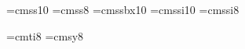 
\ifx\tenpoint\undefined\let\loadedfrommacro=Y
	
	\let\loadedfrommacro=N\fi

\font\tenss=cmss10     \font\eightss=cmss8
\font\tenssbf=cmssbx10 
\font\tensssl=cmssi10  \font\eightsl=cmssi8

\font\eighti=cmti8
\font\eightsy=cmsy8

\ifx\tenpointss\undefined
   \def\tenpointss{\def\rm{\fam0\tenss}%
       \textfont0=\tenss \scriptfont0=\eightss \scriptscriptfont0=\eightss
       \textfont1=\teni  \scriptfont1=\eighti  \scriptscriptfont1=\eighti
       \textfont2=\tensy \scriptfont2=\eightsy \scriptscriptfont2=\eightsy
       \textfont3=\tenex \scriptfont3=\tenex   \scriptscriptfont3=\tenex
       \textfont\itfam=\tensssl  \def\it{\fam\itfam\tensssl}%
       \textfont\slfam=\tensssl  \def\sl{\fam\slfam\tensssl}%
       \textfont\ttfam=\tentt  \def\tt{\fam\ttfam\tentt}%
       \textfont\bffam=\tenssbf  \scriptfont\bffam=\eightss
        \scriptscriptfont\bffam=\eightss  \def\bf{\fam\bffam\tenssbf}%
       \textfont\scfam=\tencsc \def\sc{\fam\scfam\tencsc}%
       \normalbaselineskip=12pt
       \setbox\strutbox=\hbox{\vrule height10pt depth2pt width0pt}%
       \normalbaselines\rm}
   \fi
